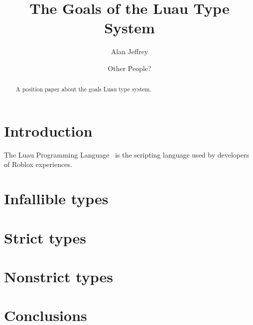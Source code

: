 \documentclass[acmsmall]{acmart}
\begin{document}
\title{The Goals of the Luau Type System}

\author{Alan Jeffrey}
\author{Other People?}

\begin{abstract}
  A position paper about the goals Luau type system.
\end{abstract}

\maketitle

\section{Introduction}

The Luau Programming Language~\cite{Luau}
is the scripting language used by developers of Roblox
experiences.

\section{Infallible types}
\section{Strict types}
\section{Nonstrict types}
\section{Conclusions}



\end{document}
